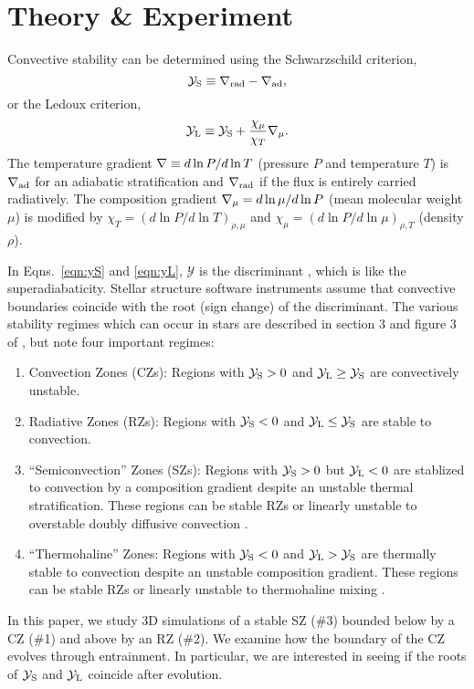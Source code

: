 \section{Theory \& Experiment}
\label{sec:theory}
Convective stability can be determined using the Schwarzschild criterion,
\begin{equation}
    \yS \equiv \gradrad - \gradad,
    \label{eqn:yS}
\end{equation}
or the Ledoux criterion,
\begin{equation}
    \yL \equiv \yS +  \frac{\chi_\mu}{\chi_T}\gradmu.
    \label{eqn:yL}
\end{equation}
The temperature gradient $\nabla \equiv d \ln P / d \ln T$ (pressure $P$ and temperature $T$) is $\nabla_{\rm{ad}}$ for an adiabatic stratification and $\nabla_{\rm{rad}}$ if the flux is entirely carried radiatively.
The composition gradient $\nabla_{\mu} = d\ln\mu/d\ln P$ (mean molecular weight $\mu$) is modified by $\chi_T = (d\ln P / d\ln T)_{\rho,\mu}$ and $\chi_\mu = (d\ln P / d\ln\mu)_{\rho,T}$ (density $\rho$).

In Eqns.~\ref{eqn:yS} and \ref{eqn:yL}, $\mathcal{Y}$ is the discriminant \citep[e.g.,][sec.~2]{mesa4}, which is like the superadiabaticity.
Stellar structure software instruments assume that convective boundaries coincide with the root (sign change) of the discriminant.
The various stability regimes which can occur in stars are described in section 3 and figure 3 of \citet{salaris_cassisi_2017}, but note four important regimes:
\begin{enumerate}
    \item Convection Zones (CZs): Regions with $\mathcal{Y}_{\rm{S}} > 0$ and $\mathcal{Y}_{\rm{L}} \geq \mathcal{Y}_{\rm{S}}$ are convectively unstable.
    \item Radiative Zones (RZs): Regions with $\mathcal{Y}_{\rm{S}} < 0$ and $\mathcal{Y}_{\rm{L}} \leq \mathcal{Y}_{\rm{S}}$ are stable to convection.
    \item ``Semiconvection'' Zones (SZs): Regions with $\mathcal{Y}_{\rm{S}} > 0$ but $\mathcal{Y}_{\rm{L}} < 0$ are stablized to convection by a composition gradient despite an unstable thermal stratification.
        These regions can be stable RZs or linearly unstable to overstable doubly diffusive convection \citep[ODDC, see][chapter 2]{garaud_2018}.
    \item ``Thermohaline'' Zones: Regions with $\mathcal{Y}_{\rm{S}} < 0$ and $\mathcal{Y}_{\rm{L}} > \mathcal{Y}_{\rm{S}}$ are thermally stable to convection despite an unstable composition gradient.
        These regions can be stable RZs or linearly unstable to thermohaline mixing \citep[see][chapter 3]{garaud_2018}.
\end{enumerate}
In this paper, we study 3D simulations of a stable SZ (\#3) bounded below by a CZ (\#1) and above by an RZ (\#2).
We examine how the boundary of the CZ evolves through entrainment.
In particular, we are interested in seeing if the roots of $\mathcal{Y}_{\rm{S}}$ and $\mathcal{Y}_{\rm{L}}$ coincide after evolution.

